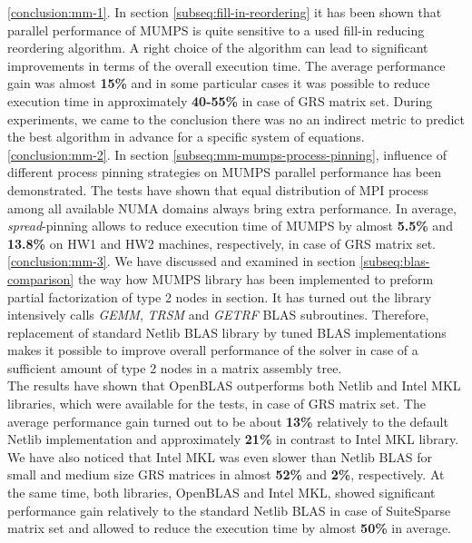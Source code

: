 \ref{conclusion:mm-1}. In section \ref{subseq:fill-in-reordering} it has been shown that parallel performance of MUMPS is quite sensitive to a used fill-in reducing reordering algorithm. A right choice of the algorithm can lead to significant improvements in terms of the overall execution time. The average performance gain was almost \textbf{15\%} and in some particular cases it was possible to reduce execution time in approximately \textbf{40-55\%} in case of GRS matrix set. During experiments, we came to the conclusion there was no an indirect metric to predict the best algorithm in advance for a specific system of equations.\\


\ref{conclusion:mm-2}. In section \ref{subseq:mm-mumps-process-pinning}, influence of different process pinning strategies on MUMPS parallel performance has been demonstrated. The tests have shown that equal distribution of MPI process among all available NUMA domains always bring extra performance. In average, \textit{spread}-pinning allows to reduce execution time of MUMPS by almost \textbf{5.5\%} and \textbf{13.8\%} on HW1 and HW2 machines, respectively, in case of GRS matrix set.\\


\ref{conclusion:mm-3}. 
We have discussed and examined in section \ref{subseq:blas-comparison} the way how MUMPS library has been implemented to preform partial factorization of type 2 nodes in section. It has turned out the library intensively calls \textit{GEMM}, \textit{TRSM} and \textit{GETRF} BLAS subroutines. Therefore, replacement of standard Netlib BLAS library by tuned BLAS implementations makes it possible to improve overall performance of the solver in case of a sufficient amount of type 2 nodes in a matrix assembly tree.\\


The results have shown that OpenBLAS outperforms both Netlib and Intel MKL libraries, which were available for the tests, in case of GRS matrix set. The average performance gain turned out to be about \textbf{13\%} relatively to the default Netlib implementation and approximately \textbf{21\%} in contrast to Intel MKL library. We have also noticed that Intel MKL was even slower than Netlib BLAS for small and medium size GRS matrices in almost \textbf{52\%} and \textbf{2\%}, respectively. At the same time, both libraries, OpenBLAS and Intel MKL, showed significant performance gain relatively to the standard Netlib BLAS in case of SuiteSparse matrix set and allowed to reduce the execution time by almost \textbf{50\%} in average. \\


